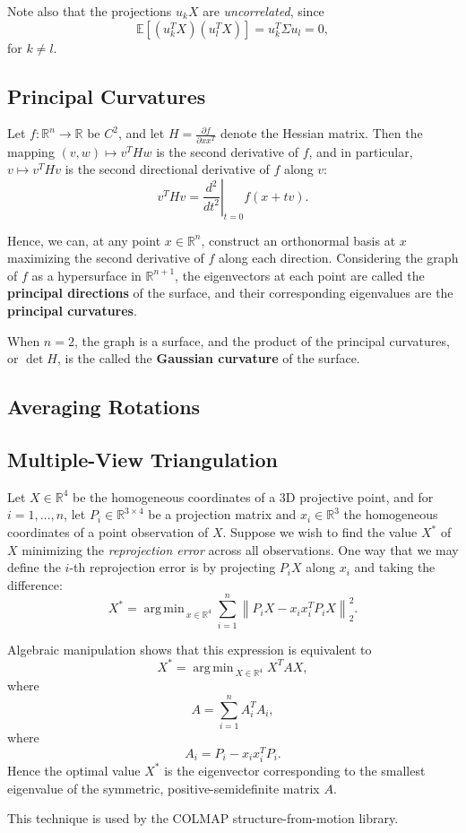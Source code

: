 \documentclass[reqno]{amsart}
\DeclareMathOperator*{\argmin}{arg\,min\,}
\numberwithin{equation}{section}
\begin{document}
Note also that the projections $u_k X$ are \emph{uncorrelated}, since
$$
    \mathbb E\left[( u_k^T X) (u_l^TX)\right] = u_k^T \Sigma u_l = 0,
$$
for $k \ne l$.

\subsection{Principal Curvatures}

Let $f : \mathbb R^n \to \mathbb R$ be $C^2$,
and let $H = \frac{\partial f}{\partial xx^T}$ denote
the Hessian matrix. Then the mapping $(v, w) \mapsto v^T H w$ is the second
derivative of $f$, and in particular, $v \mapsto v ^T H v$ is the second directional
derivative of $f$ along $v$:
$$
    v^T H v = \left.\frac{d^2}{dt^2}\right|_{t=0} f(x + tv).
$$

Hence, we can, at any point $x \in \mathbb R^n$, construct an orthonormal
basis at $x$ maximizing the second derivative of $f$ along each direction.
Considering the graph of $f$ as a hypersurface in $\mathbb R^{n+1}$,
the eigenvectors at each point 
are called the \textbf{principal directions}
of the surface, and their
corresponding eigenvalues are the \textbf{principal curvatures}.

When $n = 2$, the graph is a surface, and the product of the principal
curvatures, or $\det H$, is the called the \textbf{Gaussian curvature} of the
surface.

\subsection{Averaging Rotations}

\subsection{Multiple-View Triangulation}

Let $X \in \mathbb R^4$ be the homogeneous coordinates of a 3D projective
point, and for $i = 1, \ldots, n$, let $P_i \in \mathbb R^{3 \times 4}$
be a projection matrix and $x_i \in \mathbb R^3$ the homogeneous coordinates
of a point observation of $X$. Suppose we wish to find the value $X^*$ of $X$
minimizing the \emph{reprojection error} across all observations. One way
that we may define the $i$-th reprojection error is by projecting $P_i X$
along $x_i$ and taking the difference:
$$
    X^* = \argmin_{x \in \mathbb R^4} \sum_{i=1}^n
        \left\| P_i X - x_i x_i^T P_i X \right\|_2^2.
$$

Algebraic manipulation shows that this expression is equivalent to
$$
    X^* = \argmin_{X \in \mathbb R^4} X^T A X,
$$
where
$$
    A = \sum_{i=1}^n A_i^TA_i,
$$
where
$$
    A_i = P_i - x_i x_i^T P_i.
$$
Hence the optimal value $X^*$ is the eigenvector corresponding to the
smallest eigenvalue of the symmetric, positive-semidefinite matrix $A$.

This technique is used by the COLMAP structure-from-motion library.
\end{document}
